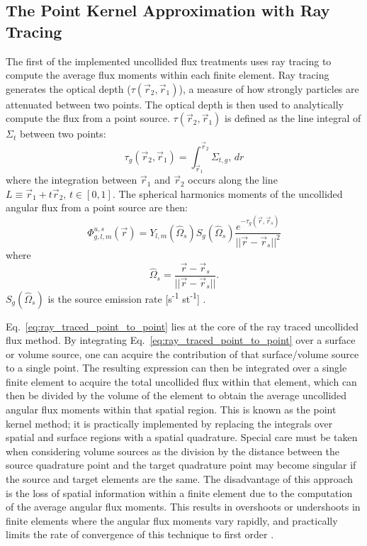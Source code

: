 \subsection{The Point Kernel Approximation with Ray Tracing}
\label{solver:radiation_transport:ray_tracing} 

The first of the implemented uncollided flux treatments uses ray tracing to compute the average flux moments within each finite element. Ray tracing generates the optical depth ($\tau(\vec{r}_{2}, \vec{r}_{1})$), a measure of how strongly particles are attenuated between two points. The optical depth is then used to analytically compute the flux from a point source. $\tau(\vec{r}_{2}, \vec{r}_{1})$ is defined as the line integral of $\Sigma_{t}$ between two points:
\begin{equation}\label{eq:optical_depth}
    \tau_{g}(\vec{r}_{2}, \vec{r}_{1}) = \int_{\vec{r}_{1}}^{\vec{r}_{2}}\Sigma_{t,g},\,dr
\end{equation}
where the integration between $\vec{r}_{1}$ and $\vec{r}_{2}$ occurs along the line $L \equiv \vec{r}_{1} + t\vec{r}_{2},\,t\in[0, 1]$. The spherical harmonics moments of the uncollided angular flux from a point source are then:
\begin{equation}\label{eq:ray_traced_point_to_point}
    \Phi_{g,l,m}^{u, s}(\vec{r}) = Y_{l,m}(\hat{\Omega}_{s})S_{g}(\hat{\Omega}_{s})\frac{e^{-\tau_{g}(\vec{r}, \vec{r}_{s})}}{||\vec{r} - \vec{r}_{s}||^{2}}
\end{equation}
where 
\begin{equation}\label{eq:point_dir}
    \hat{\Omega}_{s} = \frac{\vec{r} - \vec{r}_{s}}{||\vec{r} - \vec{r}_{s}||}\text{.}
\end{equation}
$S_{g}(\hat{\Omega}_{s})$ is the source emission rate [s\textsuperscript{-1} st\textsuperscript{-1}] \cite{harbour_uncollided}. 

Eq.~\ref{eq:ray_traced_point_to_point} lies at the core of the ray traced uncollided flux method. By integrating Eq.~\ref{eq:ray_traced_point_to_point} over a surface or volume source, one can acquire the contribution of that surface/volume source to a single point. The resulting expression can then be integrated over a single finite element to acquire the total uncollided flux within that element, which can then be divided by the volume of the element to obtain the average uncollided angular flux moments within that spatial region. This is known as the point kernel method; it is practically implemented by replacing the integrals over spatial and surface regions with a spatial quadrature. Special care must be taken when considering volume sources as the division by the distance between the source quadrature point and the target quadrature point may become singular if the source and target elements are the same. The disadvantage of this approach is the loss of spatial information within a finite element due to the computation of the average angular flux moments. This results in overshoots or undershoots in finite elements where the angular flux moments vary rapidly, and practically limits the rate of convergence of this technique to first order \cite{harbour_uncollided}. 

